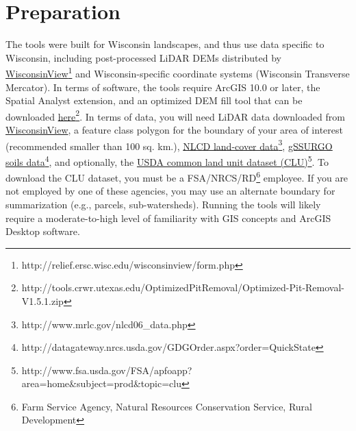 \documentclass{article}
\begin{document}
\section{Preparation}
	The tools were built for Wisconsin landscapes, and thus use data specific to Wisconsin, including post-processed LiDAR DEMs distributed by \href{http://relief.ersc.wisc.edu/wisconsinview/form.php}{WisconsinView}\footnote{http://relief.ersc.wisc.edu/wisconsinview/form.php}\label{wisconsinViewWebsite} and Wisconsin-specific coordinate systems (Wisconsin Transverse Mercator). In terms of software, the tools require ArcGIS 10.0 or later, the Spatial Analyst extension, and an optimized DEM fill tool that can be downloaded \href{http://tools.crwr.utexas.edu/OptimizedPitRemoval/Optimized-Pit-Removal-V1.5.1.zip}{here}\footnote{http://tools.crwr.utexas.edu/OptimizedPitRemoval/Optimized-Pit-Removal-V1.5.1.zip}. In terms of data, you will need LiDAR data downloaded from \href{http://relief.ersc.wisc.edu/wisconsinview/form.php}{WisconsinView}\footnotemark[1], a feature class polygon for the boundary of your area of interest (recommended smaller than 100 sq. km.), \href{http://www.mrlc.gov/nlcd06_data.php}{NLCD land-cover data}\footnote{http://www.mrlc.gov/nlcd06\_data.php}\label{nlcdWebsite}, \href{http://datagateway.nrcs.usda.gov/GDGOrder.aspx?order=QuickState}{gSSURGO soils data}\footnote{http://datagateway.nrcs.usda.gov/GDGOrder.aspx?order=QuickState}\label{nrcsWebsite}, and optionally, the \href{http://www.fsa.usda.gov/FSA/apfoapp?area=home&subject=prod&topic=clu}{USDA common land unit dataset (CLU)}\footnote{http://www.fsa.usda.gov/FSA/apfoapp?area=home\&subject=prod\&topic=clu}. To download the CLU dataset, you must be a FSA/NRCS/RD\footnote{Farm Service Agency, Natural Resources Conservation Service, Rural Development} employee. If you are not employed by one of these agencies, you may use an alternate boundary for summarization (e.g., parcels, sub-watersheds). Running the tools will likely require a moderate-to-high level of familiarity with GIS concepts and ArcGIS Desktop software.
\end{document}
